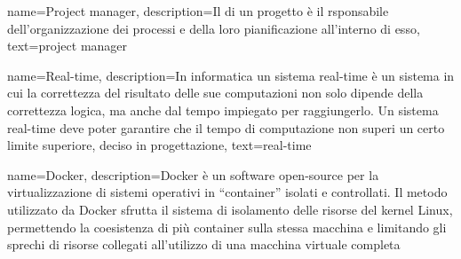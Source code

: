 {
    name={Project manager},
    description={Il  di un progetto è il rsponsabile dell'organizzazione dei processi e della loro pianificazione all'interno di esso},
    text={project manager}
}

{
    name={Real-time},
    description={In informatica un sistema real-time è un sistema in cui la correttezza del risultato delle sue computazioni non solo dipende della correttezza logica, ma anche dal tempo impiegato per raggiungerlo. Un sistema real-time deve poter garantire che il tempo di computazione non superi un certo limite superiore, deciso in progettazione},
    text={real-time}
}

{
    name={Docker},
    description={Docker è un software open-source per la virtualizzazione di sistemi operativi in ``container'' isolati e controllati. Il metodo utilizzato da Docker sfrutta il sistema di isolamento delle risorse del kernel Linux, permettendo la coesistenza di più container sulla stessa macchina e limitando gli sprechi di risorse collegati all'utilizzo di una macchina virtuale completa}
}

